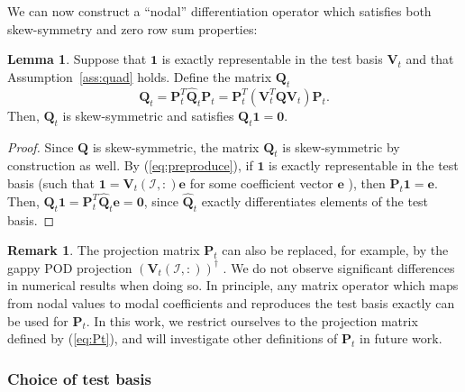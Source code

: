 \documentclass[preprint,10pt]{elsarticle}
\theoremstyle{definition}
\theoremstyle{lemma}
\newtheorem{lemma}{Lemma}
\newtheorem*{remark}{Remark}
\theoremstyle{theorem}
\theoremstyle{assumption}
\renewcommand{\hat}{\widehat}
\newcommand{\LRp}[1]{\left( #1 \right)}
\begin{document}
We can now construct a ``nodal'' differentiation operator which satisfies both skew-symmetry and zero row sum properties: 
\begin{lemma}
Suppose that $\bm{1}$ is exactly representable in the test basis $\bm{V}_t$ and that Assumption~\ref{ass:quad} holds.  Define the matrix $\bm{Q}_t$
\begin{equation}
\bm{Q}_t = \bm{P}_t^T\hat{\bm{Q}}_t\bm{P}_t = \bm{P}_t^T\LRp{\bm{V}_t^T\bm{Q}\bm{V}_t}\bm{P}_t.
\label{eq:nodalQ}
\end{equation}
Then, $\bm{Q}_t$ is skew-symmetric and satisfies $\bm{Q}_t\bm{1} = \bm{0}$.  
\label{thm:Qt}
\end{lemma}
\begin{proof}
Since $\bm{Q}$ is skew-symmetric, the matrix $\bm{Q}_t$ is skew-symmetric by construction as well.  By (\ref{eq:preproduce}), if $\bm{1}$ is exactly representable in the test basis (such that $\bm{1} = \bm{V}_t\LRp{\mathcal{I},:}\bm{e}$ for some coefficient vector $\bm{e}$  ), then  $\bm{P}_t\bm{1} = \bm{e}$.  Then, $\bm{Q}_t\bm{1} = \bm{P}_t^T\hat{\bm{Q}}_t\bm{e} = \bm{0}$, since $\hat{\bm{Q}}_t$ exactly differentiates elements of the test basis.
\end{proof}

\begin{remark}
The projection matrix $\bm{P}_t$ can also be replaced, for example, by the gappy POD projection $\LRp{\bm{V}_t\LRp{\mathcal{I},:}}^{\dagger}$ \cite{willcox2006unsteady,astrid2008missing}.  We do not observe significant differences in numerical results when doing so.  In principle, any matrix operator which maps from nodal values to modal coefficients and reproduces the test basis exactly can be used for $\bm{P}_t$.  In this work, we restrict ourselves to the projection matrix defined by (\ref{eq:Pt}), and will investigate other definitions of $\bm{P}_t$ in future work.
\end{remark}

\subsubsection{Choice of test basis}
\end{document}
